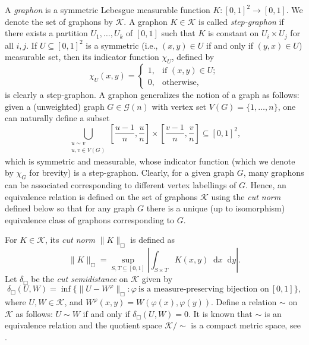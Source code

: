 \documentclass[11pt]{article}
\theoremstyle{plain}
\theoremstyle{definition}
\numberwithin{equation}{section}
\newcommand{\dif}{\mathop{}\!\mathrm{d}}
\begin{document}
A \emph{graphon} is a symmetric Lebesgue measurable function $K:[0,1]^2 \rightarrow [0,1]$. 
We denote the set of graphons by $\mathcal{K}$. A graphon $K\in \mathcal{K}$ is 
called \emph{step-graphon} if there exists a partition $U_1, \ldots, U_k$ of $[0,1]$ 
such that $K$ is constant on $U_i\times U_j$ for all $i,j$. If $U\subseteq [0,1]^2$ 
is a symmetric (i.e., $(x,y)\in U$ if and only if $(y,x)\in U$) measurable set, 
then its indicator function $\chi_U$, defined by 
\[
\chi_U(x,y) = 
\begin{cases}
    1, & \text{if }(x,y) \in U; \\
    0, & \text{otherwise},
\end{cases}
\]
is clearly a step-graphon. A graphon generalizes the notion of a graph as follows: 
given a (unweighted) graph $G\in \mathcal{G}(n)$ with vertex set $V(G)=\{1, \ldots, n\}$, 
one can naturally define a subset
\[ 
\bigcup_{\substack{u\sim v\\ u,v\in V(G)}} \left[\frac{u-1}{n}, \frac{u}{n}\right]\times 
\left[\frac{v-1}{n}, \frac{v}{n}\right]\subseteq [0,1]^2,
\]
which is symmetric and measurable, whose indicator function (which we denote by $\chi_G$ for brevity) 
is a step-graphon. Clearly, for a given graph $G$, many graphons can be associated corresponding to 
different vertex labellings of $G$. Hence, an equivalence relation is defined on the set of graphons 
$\mathcal{K}$ using the \emph{cut norm} defined below so that for any graph $G$ there is a unique 
(up to isomorphism) equivalence class of graphons corresponding to $G$.
 
For $K\in \mathcal{K}$, its \emph{cut norm} $\| K \|_{\Box}$ is defined as 
\[ 
\| K \|_{\Box} = \sup_{S, T \subseteq [0,1]} \left| \int_{S\times T} K(x,y) \dif{x}\dif{y}\right|.
\]
Let $\delta_{\Box}$ be the \emph{cut semidistance} on $\mathcal{K}$ given by 
\[
\delta_{\Box}(U, W) = \inf\{\|U - W^{\varphi} \|_{\Box} : \varphi\ \text{is a measure-preserving bijection on}\ [0,1]\},
\]
where $U, W\in \mathcal{K}$, and $W^{\varphi}(x,y) = W(\varphi(x), \varphi(y))$. Define 
a relation $\sim$ on $\mathcal{K}$ as follows: 
$U \sim W$ if and only if $\delta_{\Box}(U, W) = 0$. %
It is known that $\sim$ is an equivalence relation and the quotient space $\mathcal{K}/\sim$ 
is a compact metric space, see \cite[Theorem 5.1]{Lovasz_Szegedy_2007}. 
\end{document}
